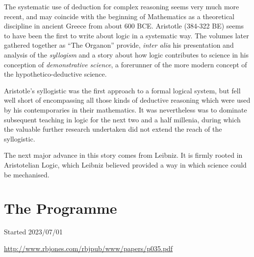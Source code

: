 \documentclass[10pt,titlepage]{book}
\begin{document}
The systematic use of deduction for complex reasoning seems very much more recent, and may coincide with the beginning of Mathematics as a theoretical discipline in ancient Greece from about 600 BCE.
Aristotle (384-322 BE) seems to have been the first to write about logic in a systematic way.
The volumes later gathered together as ``The Organon'' provide, \emph{inter alia} his presentation and analysis of the \emph{syllogism} and a story about how logic contributes to science in his conception of \emph{demonstrative science}, a forerunner of the more modern concept of the hypothetico-deductive science.

Aristotle's syllogistic was the first approach to a formal logical system, but fell well short of encompassing all those kinds of deductive reasoning which were used by his contemporaries in their mathematics.
It was nevertheless was to dominate subsequent teaching in logic for the next two and a half millenia, during which the valuable further research undertaken did not extend the reach of the syllogistic.

The next major advance in this story comes from Leibniz.
It is firmly rooted in Aristotelian Logic, which Leibniz believed provided a way in which science could be mechanised.




\section{The Programme}




\pagebreak
{}
{}





Started 2023/07/01


\href{http://www.rbjones.com/rbjpub/www/papers/p034.pdf}{http://www.rbjones.com/rbjpub/www/papers/p035.pdf}

\end{document}
